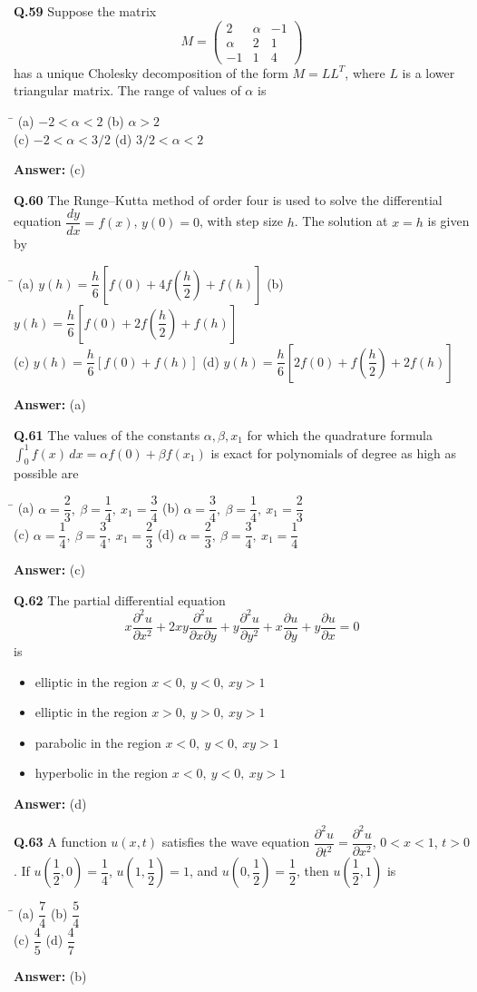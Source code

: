 \documentclass[11pt,a4paper]{article}
\newcommand{\optsfour}[4]{%
  \begin{tabbing}
    \hspace{0.48\linewidth}\=\kill
    (a) #1 \> (b) #2 \\[2pt]
    (c) #3 \> (d) #4
  \end{tabbing}%
}
\newcommand{\optslist}[4]{%
  \begin{itemize}
    \setlength{\itemsep}{2pt}\setlength{\parskip}{0pt}
    \item[(a)] #1
    \item[(b)] #2
    \item[(c)] #3
    \item[(d)] #4
  \end{itemize}%
}
\newcommand{\ans}[1]{\textbf{Answer:} #1\par\medskip}
\begin{document}
\textbf{Q.59} Suppose the matrix
\[
  M = \begin{pmatrix}
    2 & \alpha & -1 \\
    \alpha & 2 & 1 \\
    -1 & 1 & 4
  \end{pmatrix}
\]
has a unique Cholesky decomposition of the form $M = LL^T$, where $L$ is a lower triangular matrix. The range of values of $\alpha$ is
\optsfour{$-2 < \alpha < 2$}{$\alpha > 2$}{$-2 < \alpha < 3/2$}{$3/2 < \alpha < 2$}
\ans{(c)}

\textbf{Q.60} The Runge--Kutta method of order four is used to solve the differential equation $\dfrac{dy}{dx} = f(x)$, $y(0) = 0$, with step size $h$. The solution at $x = h$ is given by
\optsfour{$y(h) = \dfrac{h}{6}\left[f(0) + 4f\!\left(\dfrac{h}{2}\right) + f(h)\right]$}{$y(h) = \dfrac{h}{6}\left[f(0) + 2f\!\left(\dfrac{h}{2}\right) + f(h)\right]$}{$y(h) = \dfrac{h}{6}[f(0) + f(h)]$}{$y(h) = \dfrac{h}{6}\left[2f(0) + f\!\left(\dfrac{h}{2}\right) + 2f(h)\right]$}
\ans{(a)}

\textbf{Q.61} The values of the constants $\alpha, \beta, x_1$ for which the quadrature formula $\displaystyle\int_0^1 f(x)\,dx = \alpha f(0) + \beta f(x_1)$ is exact for polynomials of degree as high as possible are
\optsfour{$\alpha = \dfrac{2}{3},\ \beta = \dfrac{1}{4},\ x_1 = \dfrac{3}{4}$}{$\alpha = \dfrac{3}{4},\ \beta = \dfrac{1}{4},\ x_1 = \dfrac{2}{3}$}{$\alpha = \dfrac{1}{4},\ \beta = \dfrac{3}{4},\ x_1 = \dfrac{2}{3}$}{$\alpha = \dfrac{2}{3},\ \beta = \dfrac{3}{4},\ x_1 = \dfrac{1}{4}$}
\ans{(c)}

\textbf{Q.62} The partial differential equation
\[
  x\frac{\partial^2 u}{\partial x^2} + 2xy\frac{\partial^2 u}{\partial x \partial y} + y\frac{\partial^2 u}{\partial y^2} + x\frac{\partial u}{\partial y} + y\frac{\partial u}{\partial x} = 0
\]
is
\optslist{elliptic in the region $x < 0,\ y < 0,\ xy > 1$}{elliptic in the region $x > 0,\ y > 0,\ xy > 1$}{parabolic in the region $x < 0,\ y < 0,\ xy > 1$}{hyperbolic in the region $x < 0,\ y < 0,\ xy > 1$}
\ans{(d)}

\textbf{Q.63} A function $u(x,t)$ satisfies the wave equation $\dfrac{\partial^2 u}{\partial t^2} = \dfrac{\partial^2 u}{\partial x^2}$, $0 < x < 1$, $t > 0$. If $u\!\left(\dfrac{1}{2}, 0\right) = \dfrac{1}{4}$, $u\!\left(1, \dfrac{1}{2}\right) = 1$, and $u\!\left(0, \dfrac{1}{2}\right) = \dfrac{1}{2}$, then $u\!\left(\dfrac{1}{2}, 1\right)$ is
\optsfour{$\dfrac{7}{4}$}{$\dfrac{5}{4}$}{$\dfrac{4}{5}$}{$\dfrac{4}{7}$}
\ans{(b)}
\end{document}
